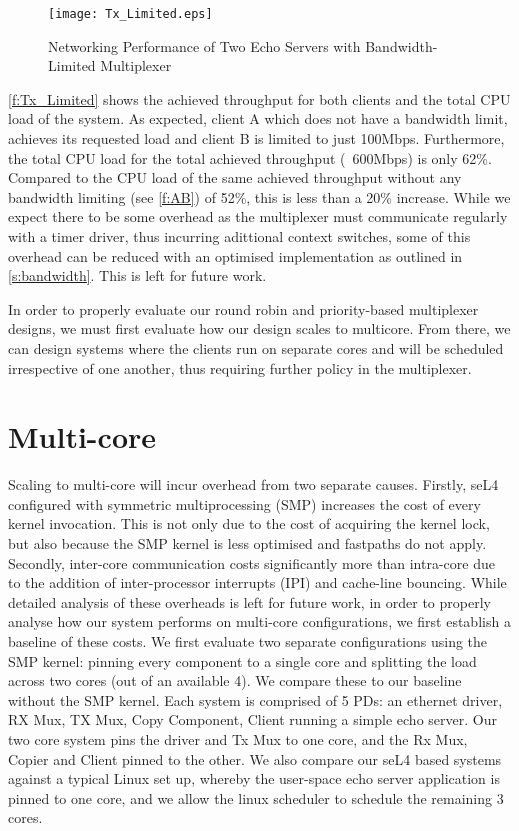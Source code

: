 \begin{figure}[h]
    \centering
    \texttt{[image: Tx\_Limited.eps]}
    \caption{Networking Performance of Two Echo Servers with Bandwidth-Limited Multiplexer}
    \label{f:Tx_Limited}
\end{figure}

\autoref{f:Tx_Limited} shows the achieved throughput for both clients and the total CPU load of the system. As expected, 
client A which does not have a bandwidth limit, achieves its requested load and client B is limited to just 100Mbps. Furthermore, 
the total CPU load for the total achieved throughput (~600Mbps) is only 62\%. Compared to the CPU load of the same 
achieved throughput without any bandwidth limiting (see \autoref{f:AB}) of 52\%, this is less than a 20\% increase. While we
expect there to be some overhead as the multiplexer must communicate regularly with a timer driver, thus incurring adittional
context switches, some of this overhead can be reduced with an optimised implementation 
as outlined in \autoref{s:bandwidth}. This is left for future work.

In order to properly evaluate our round robin and priority-based multiplexer designs, we must first evaluate how our
design scales to multicore. From there, we can design systems where the clients run on separate cores and will be scheduled irrespective
of one another, thus requiring further policy in the multiplexer.

\section{Multi-core}

Scaling to multi-core will incur overhead from two separate causes. Firstly, seL4 configured with symmetric multiprocessing (SMP) increases
the cost of every kernel invocation. This is not only due to the cost of acquiring the kernel lock, but also because the SMP kernel is
less optimised and fastpaths do not apply. Secondly, inter-core communication costs significantly more than intra-core due to the addition of 
inter-processor interrupts (IPI) and cache-line bouncing. While detailed analysis of these overheads is left for future work, in order to properly
analyse how our system performs on multi-core configurations, we first establish a baseline of these costs. We first evaluate two separate configurations
using the SMP kernel: pinning every component to a single core and splitting the load across two cores (out of an available 4). 
We compare these to our baseline without the SMP kernel. Each system is comprised of 5 PDs: an ethernet driver, RX Mux, 
TX Mux, Copy Component, Client running a simple echo server. Our two core system pins the driver and Tx Mux to one core, and 
the Rx Mux, Copier and Client pinned to the other. We also compare our seL4 based systems against a typical Linux set up, whereby
the user-space echo server application is pinned to one core, and we allow the linux scheduler to schedule the remaining 3 cores. \\ 

